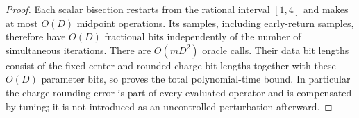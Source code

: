 \begin{proof}
Each scalar bisection restarts from the rational interval \([1,4]\)
and makes at most \(O(D)\) midpoint operations. Its samples,
including early-return samples, therefore have \(O(D)\) fractional
bits independently of the number of simultaneous iterations.
There are \(O(mD^2)\) oracle calls. Their data bit lengths consist
of the fixed-center and rounded-charge bit lengths together with
these \(O(D)\) parameter bits, so  proves
the total polynomial-time bound.
In particular the charge-rounding error is part of every evaluated
operator and is compensated by tuning; it is not introduced as an
uncontrolled perturbation afterward.
\end{proof}

